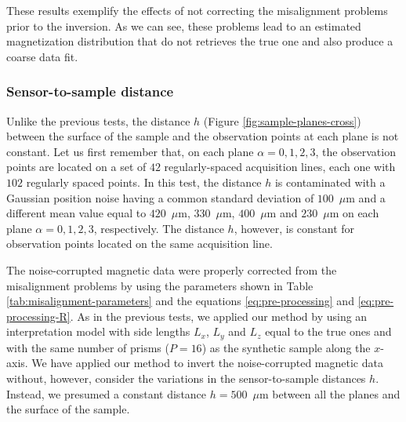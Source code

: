 \documentclass[galley,gc]{agutex}
\begin{document}
\begin{article}
These results exemplify the effects of not correcting the
misalignment problems prior to the inversion.
As we can see, these problems lead to an estimated magnetization 
distribution that do not retrieves the true one and also
produce a coarse data fit.

\subsubsection{Sensor-to-sample distance}

Unlike the previous tests, the distance $h$ 
(Figure \ref{fig:sample-planes-cross}) between the 
surface of the sample and the observation
points at each plane is not constant.
Let us first remember that, on each plane $\alpha = 0, 1, 2, 3$,
the observation points are located on a set 
of $42$ regularly-spaced acquisition 
lines, each one with $102$ regularly spaced points.
In this test, the distance $h$ is contaminated with a
Gaussian position noise having a common standard deviation of
$100$~$\mu$m and a different mean value equal to 
$420$~$\mu$m, $330$~$\mu$m, $400$~$\mu$m and $230$~$\mu$m
on each plane $\alpha = 0, 1, 2, 3$, respectively.
The distance $h$, however, is constant for observation points 
located on the same acquisition line.

The noise-corrupted magnetic data were properly corrected 
from the misalignment problems by using the parameters shown in 
Table \ref{tab:misalignment-parameters} and the equations 
\ref{eq:pre-processing} and \ref{eq:pre-processing-R}.
As in the previous tests, we applied our method by using
an interpretation model with side lengths $L_{x}$, $L_{y}$ 
and $L_{z}$ equal to the true ones and with the same number 
of prisms ($P = 16$) as the synthetic sample along the $x$-axis.
We have applied our method to invert the noise-corrupted magnetic 
data without, however, consider the variations in the 
sensor-to-sample distances $h$. Instead, we presumed a constant
distance $h = 500$~$\mu$m between all the planes and the surface
of the sample.


\end{article}
\end{document}
